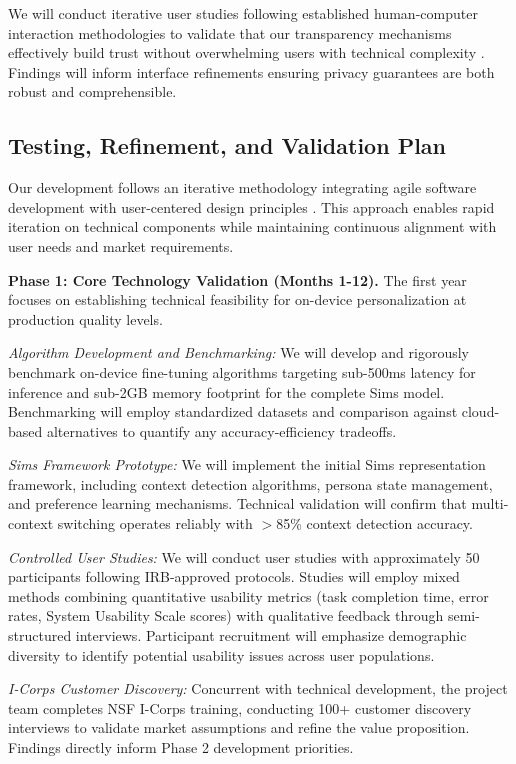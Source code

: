 \documentclass[11pt]{article}
\begin{document}
We will conduct iterative user studies following established human-computer interaction methodologies to validate that our transparency mechanisms effectively build trust without overwhelming users with technical complexity \cite{hussain2009current}. Findings will inform interface refinements ensuring privacy guarantees are both robust and comprehensible.

\vspace*{-8pt}
\subsection{Testing, Refinement, and Validation Plan}
\vspace*{-8pt}
Our development follows an iterative methodology integrating agile software development with user-centered design principles \cite{silva2011user}. This approach enables rapid iteration on technical components while maintaining continuous alignment with user needs and market requirements.

\textbf{Phase 1: Core Technology Validation (Months 1-12).}
The first year focuses on establishing technical feasibility for on-device personalization at production quality levels.

\textit{Algorithm Development and Benchmarking:} We will develop and rigorously benchmark on-device fine-tuning algorithms targeting sub-500ms latency for inference and sub-2GB memory footprint for the complete Sims model. Benchmarking will employ standardized datasets and comparison against cloud-based alternatives to quantify any accuracy-efficiency tradeoffs.

\textit{Sims Framework Prototype:} We will implement the initial Sims representation framework, including context detection algorithms, persona state management, and preference learning mechanisms. Technical validation will confirm that multi-context switching operates reliably with $>$85\% context detection accuracy.

\textit{Controlled User Studies:} We will conduct user studies with approximately 50 participants following IRB-approved protocols. Studies will employ mixed methods combining quantitative usability metrics (task completion time, error rates, System Usability Scale scores) with qualitative feedback through semi-structured interviews. Participant recruitment will emphasize demographic diversity to identify potential usability issues across user populations.

\textit{I-Corps Customer Discovery:} Concurrent with technical development, the project team completes NSF I-Corps training, conducting 100+ customer discovery interviews to validate market assumptions and refine the value proposition. Findings directly inform Phase 2 development priorities.
\end{document}

